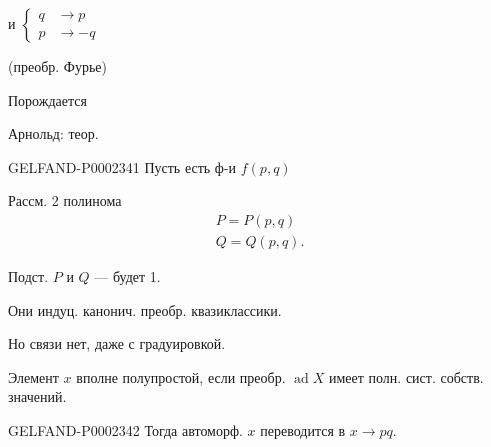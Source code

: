и
$\left\{\begin{aligned}q&\to p\\p&\to -q\end{aligned}\right.$

(преобр. Фурье)



Порождается





Арнольд: теор.



\begin{GelfandAdjacentEvidence}{GELFAND-P000234}{1}
Пусть есть ф-и $f(p,q)$



\end{GelfandAdjacentEvidence}

Рассм. 2 полинома
\begin{gather*}
 P=P(p,q)\\
 Q=Q(p,q).
\end{gather*}



Подст. $P$ и $Q$ — будет 1.



Они индуц. канонич. преобр. квазиклассики.



Но связи нет, даже с градуировкой.



Элемент $x$ вполне полупростой, если преобр. $\operatorname{ad}X$ имеет полн. сист. собств. значений.



\begin{GelfandAdjacentEvidence}{GELFAND-P000234}{2}
Тогда автоморф. $x$ переводится в $x\to pq$.




\end{GelfandAdjacentEvidence}

